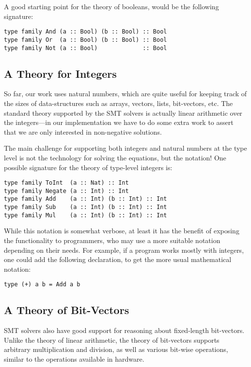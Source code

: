 \documentclass{sigplanconf}
\begin{document}
A good starting point for the theory of booleans, would be the following
signature:
\begin{Verbatim}
type family And (a :: Bool) (b :: Bool) :: Bool
type family Or  (a :: Bool) (b :: Bool) :: Bool
type family Not (a :: Bool)             :: Bool
\end{Verbatim}


\subsection{A Theory for Integers}

So far, our work uses natural numbers, which are quite useful for
keeping track of the sizes of data-structures such as arrays, vectors,
lists, bit-vectors, etc.  The standard theory supported by the SMT solvers
is actually linear arithmetic over the integers---in our implementation
we have to do some extra work to assert that we are only interested
in non-negative solutions.

The main challenge for supporting both integers and natural numbers
at the type level is not the technology for solving the equations, but
the notation!  One possible signature for the theory of type-level
integers is:
\begin{Verbatim}
type family ToInt  (a :: Nat) :: Int
type family Negate (a :: Int) :: Int
type family Add    (a :: Int) (b :: Int) :: Int
type family Sub    (a :: Int) (b :: Int) :: Int
type family Mul    (a :: Int) (b :: Int) :: Int
\end{Verbatim}
While this notation is somewhat verbose, at least it has the benefit
of exposing the functionality to programmers, who may use a more suitable
notation depending on their needs.  For example, if a program works
mostly with integers, one could add the following declaration, to get
the more usual mathematical notation:
\begin{Verbatim}
type (+) a b = Add a b
\end{Verbatim}



\subsection{A Theory of Bit-Vectors}
SMT solvers also have good support for reasoning about fixed-length bit-vectors.
Unlike the theory of linear arithmetic, the theory of bit-vectors
supports arbitrary multiplication and division, as well as various bit-wise
operations, similar to the operations available in hardware.
\end{document}
